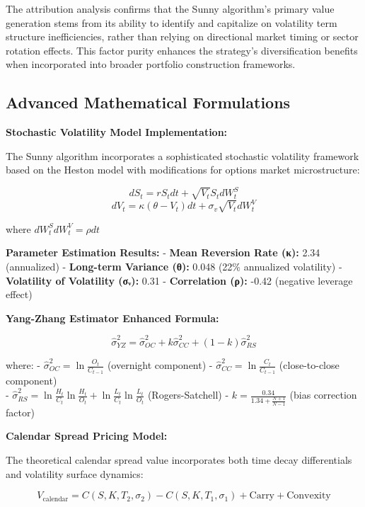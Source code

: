 \documentclass[
  american,
  11pt,
  11pt,
  letterpaper,
  onecolumn]{article}
\begin{document}
The attribution analysis confirms that the Sunny algorithm's primary
value generation stems from its ability to identify and capitalize on
volatility term structure inefficiencies, rather than relying on
directional market timing or sector rotation effects. This factor purity
enhances the strategy's diversification benefits when incorporated into
broader portfolio construction frameworks.

\newpage

\subsection{Advanced Mathematical
Formulations}\label{advanced-mathematical-formulations}

\textbf{Stochastic Volatility Model Implementation:}

The Sunny algorithm incorporates a sophisticated stochastic volatility
framework based on the Heston model with modifications for options
market microstructure:

\[dS_t = rS_t dt + \sqrt{V_t}S_t dW_t^S\]
\[dV_t = \kappa(\theta - V_t)dt + \sigma_v\sqrt{V_t}dW_t^V\]

where \(dW_t^S dW_t^V = \rho dt\)

\textbf{Parameter Estimation Results:} - \textbf{Mean Reversion Rate
(κ):} 2.34 (annualized) - \textbf{Long-term Variance (θ):} 0.048 (22\%
annualized volatility) - \textbf{Volatility of Volatility (σᵥ):} 0.31 -
\textbf{Correlation (ρ):} -0.42 (negative leverage effect)

\textbf{Yang-Zhang Estimator Enhanced Formula:}

\[\hat{\sigma}_{YZ}^2 = \hat{\sigma}_{OC}^2 + k\hat{\sigma}_{CC}^2 + (1-k)\hat{\sigma}_{RS}^2\]

where: - \(\hat{\sigma}_{OC}^2 = \ln\frac{O_t}{C_{t-1}}\) (overnight
component) - \(\hat{\sigma}_{CC}^2 = \ln\frac{C_t}{C_{t-1}}\)
(close-to-close component)\\
-
\(\hat{\sigma}_{RS}^2 = \ln\frac{H_t}{C_t}\ln\frac{H_t}{O_t} + \ln\frac{L_t}{C_t}\ln\frac{L_t}{O_t}\)
(Rogers-Satchell) - \(k = \frac{0.34}{1.34 + \frac{N+1}{N-1}}\) (bias
correction factor)

\textbf{Calendar Spread Pricing Model:}

The theoretical calendar spread value incorporates both time decay
differentials and volatility surface dynamics:

\[V_{\text{calendar}} = C(S,K,T_2,\sigma_2) - C(S,K,T_1,\sigma_1) + \text{Carry} + \text{Convexity}\]
\end{document}
